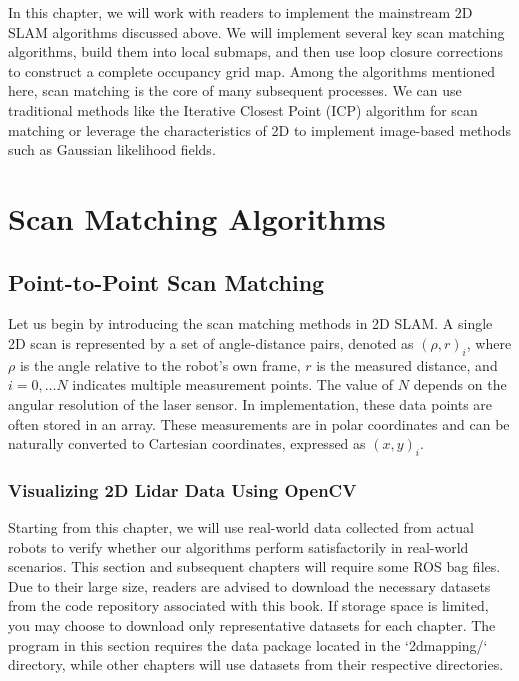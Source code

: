 In this chapter, we will work with readers to implement the mainstream 2D SLAM algorithms discussed above. We will implement several key scan matching algorithms, build them into local submaps, and then use loop closure corrections to construct a complete occupancy grid map. Among the algorithms mentioned here, scan matching is the core of many subsequent processes. We can use traditional methods like the Iterative Closest Point (ICP) algorithm for scan matching or leverage the characteristics of 2D to implement image-based methods such as Gaussian likelihood fields.

\section{Scan Matching Algorithms}  
\subsection{Point-to-Point Scan Matching}  

Let us begin by introducing the scan matching methods in 2D SLAM. A single 2D scan is represented by a set of angle-distance pairs, denoted as $(\rho, r)_i$, where $\rho$ is the angle relative to the robot's own frame, $r$ is the measured distance, and $i = 0, \ldots N$ indicates multiple measurement points. The value of $N$ depends on the angular resolution of the laser sensor. In implementation, these data points are often stored in an array. These measurements are in polar coordinates and can be naturally converted to Cartesian coordinates, expressed as $(x,y)_i$.  

\subsubsection{Visualizing 2D Lidar Data Using OpenCV}  

Starting from this chapter, we will use real-world data collected from actual robots to verify whether our algorithms perform satisfactorily in real-world scenarios. This section and subsequent chapters will require some ROS bag files. Due to their large size, readers are advised to download the necessary datasets from the code repository associated with this book. If storage space is limited, you may choose to download only representative datasets for each chapter. The program in this section requires the data package located in the `2dmapping/` directory, while other chapters will use datasets from their respective directories.  

